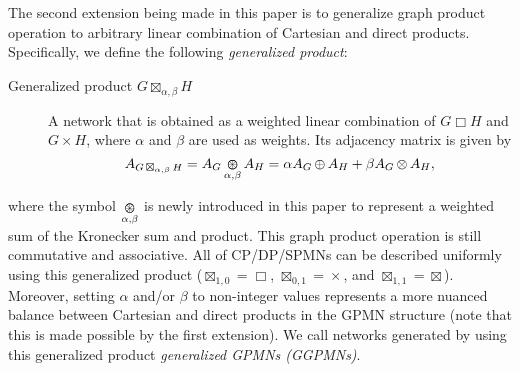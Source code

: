 \documentclass{article}
\DeclareMathOperator*{\CP}{\Box}
\DeclareMathOperator*{\DP}{\times}
\DeclareMathOperator*{\SP}{\boxtimes}
\DeclareMathOperator*{\KS}{\oplus}
\DeclareMathOperator*{\KP}{\otimes}
\DeclareMathOperator*{\GP}{\boxtimes}
\DeclareMathOperator*{\KG}{\mathrlap{\oplus}\otimes}
\begin{document}
The second extension being made in this paper is to generalize graph
product operation to arbitrary linear combination of Cartesian and
direct products. Specifically, we define the following {\em
  generalized product}:
\begin{description}
\item[Generalized product $\displaystyle G \GP_{\alpha, \beta} H$] A
  network that is obtained as a weighted linear combination of $G \CP
  H$ and $G \DP H$, where $\alpha$ and $\beta$ are used as
  weights. Its adjacency matrix is given by
\begin{equation}
A_{G \GP_{\alpha, \beta} H} = A_G \KG_{\alpha, \beta} A_H = \alpha A_G \KS A_H + \beta A_G \KP A_H, \label{eq:gp}
\end{equation}
\end{description}
where the symbol $\displaystyle\KG_{\alpha, \beta}$ is newly
introduced in this paper to represent a weighted sum of the Kronecker
sum and product. This graph product operation is still commutative and
associative. All of CP/DP/SPMNs can be described uniformly using this
generalized product ($\displaystyle\GP_{1,0} = \CP$,
$\displaystyle\GP_{0,1} = \DP$, and $\displaystyle\GP_{1,1} =
\SP$). Moreover, setting $\alpha$ and/or $\beta$ to non-integer values
represents a more nuanced balance between Cartesian and direct
products in the GPMN structure (note that this is made possible by the
first extension). We call networks generated by using this generalized
product {\em generalized GPMNs (GGPMNs)}.
\end{document}
